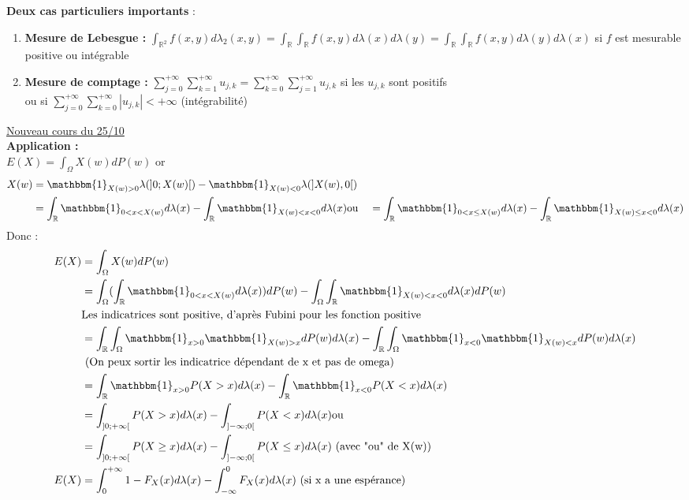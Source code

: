 \documentclass{article}
\theoremstyle{plain}%
\theoremstyle{definition}
\theoremstyle{remark}
\begin{document}
    \textbf{Deux cas particuliers importants} : \begin{enumerate}
        \item \textbf{Mesure de Lebesgue :} $ \int_{\mathbb{R}^2}^{}f(x,y)d \lambda _2(x,y) = \int_{\mathbb{R}}^{}\int_{\mathbb{R}}^{} f(x,y) d \lambda (x) d \lambda (y) = \int_{\mathbb{R}}^{}\int_{\mathbb{R}}^{} f(x,y) d \lambda (y) d \lambda (x)$ si $ f $ est mesurable positive ou intégrable
        \item \textbf{Mesure de comptage :} $ \sum_{j=0}^{+\infty }\sum_{k=1}^{+\infty }u_{j,k} = \sum_{k=0}^{+\infty } \sum_{j=1}^{+\infty } u_{j,k} $ si les $ u_{j,k} $ sont positifs \\
        ou si $ \sum_{j=0}^{+\infty }\sum_{k=0}^{+\infty } \left| u_{j,k} \right| < + \infty  $ (intégrabilité)   
    \end{enumerate}

\underline{Nouveau cours du 25/10} \\

    \textbf{Application :} \\
    $ E(X) = \int_{\Omega }^{}X(w)dP(w) $ or 
    \begin{align*}
        X(w) &= \mathbbm{1}_{X(w)>0}\lambda (]0;X(w)[) - \mathbbm{1}_{X(w) < 0}\lambda (]X(w),0[) \\
            &= \int_{\mathbb{R}}^{}\mathbbm{1}_{0<x<X(w)}d \lambda (x)- \int_{\mathbb{R}}^{} \mathbbm{1}_{X(w) < x <0}d \lambda (x)
        \text{ou } &= \int_{\mathbb{R}}^{}\mathbbm{1}_{0<x \leq X(w)}d \lambda (x)- \int_{\mathbb{R}}^{} \mathbbm{1}_{X(w) \leq x <0}d \lambda (x)
    \end{align*}
    Donc : 
    \begin{align*}
        E(X) &= \int_{\Omega }^{}X(w)dP(w) \\
            &=\int_{\Omega }^{} ( \int_{\mathbb{R}}^{} \mathbbm{1}_{0< x< X(w)} d \lambda (x)) dP(w) - \int_{\Omega }^{}\int_{\mathbb{R}}^{} \mathbbm{1}_{X(w) < x < 0}d \lambda (x) dP(w) \\
            & \text{Les indicatrices sont positive, d'après Fubini pour les fonction positive} \\
            &= \int_{\mathbb{R}}^{}\int_{\Omega }^{} \mathbbm{1}_{x>0}\mathbbm{1}_{X(w)>x}d P(w) d \lambda (x) - \int_{\mathbb{R}}^{}\int_{\Omega }^{} \mathbbm{1}_{x<0}\mathbbm{1}_{X(w) < x} dP(w) d \lambda (x)  \\
            & \text{ (On peux sortir les indicatrice dépendant de x et pas de omega)}\\ 
            &= \int_{\mathbb{R}}^{} \mathbbm{1}_{x>0}P(X > x) d \lambda (x) - \int_{\mathbb{R}}^{}\mathbbm{1}_{x<0}P(X<x) d \lambda (x) \\
            &= \int_{]0;+\infty [}^{}P(X>x) d \lambda (x) - \int_{]-\infty ;0[}^{} P(X<x) d \lambda (x) 
            \text{ou } \\
            &= \int_{]0;+\infty [}^{}P(X \geq x) d \lambda (x) - \int_{]-\infty ;0[}^{} P(X \leq x) d \lambda (x) \text{ (avec "ou" de X(w))} \\
        E(X) &= \int_{0}^{+\infty } 1-F_X(x) d \lambda (x) - \int_{- \infty }^{0} F_X(x) d \lambda (x) \text{ (si x a une espérance)}
    \end{align*}
\end{document}
